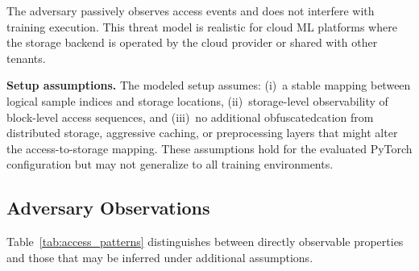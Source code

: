 \documentclass{llncs}
\begin{document}
The adversary passively observes access events and does not interfere with training execution.
This threat model is realistic for cloud ML platforms where the storage backend is operated by the cloud provider or shared with other tenants.

\medskip
\noindent\textbf{Setup assumptions.}
The modeled setup assumes: (i)~a stable mapping between logical sample indices and storage locations, (ii)~storage-level observability of block-level access sequences, and (iii)~no additional obfuscatedcation from distributed storage, aggressive caching, or preprocessing layers that might alter the access-to-storage mapping.
These assumptions hold for the evaluated PyTorch configuration but may not generalize to all training environments.

\subsection{Adversary Observations}

Table~\ref{tab:access_patterns} distinguishes between directly observable properties and those that may be inferred under additional assumptions.
\end{document}
